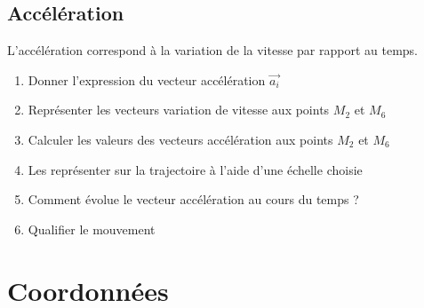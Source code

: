 \documentclass[a4paper,11pt,fleqn]{article}%
\begin{document}
	\subsection*{Accélération}
	L'accélération correspond à la variation de la vitesse par rapport au temps.
	\begin{enumerate}[resume]
	\item Donner l'expression du vecteur accélération $\vec{a_i}$
	\item Représenter les vecteurs variation de vitesse aux points $M_2$ et $M_6$
	\item Calculer les valeurs des vecteurs accélération aux points $M_2$ et $M_6$
	\item Les représenter sur la trajectoire à l'aide d'une échelle choisie
	\item Comment évolue le vecteur accélération au cours du temps ?
	\item Qualifier le mouvement
	\end{enumerate}
\section{Coordonnées}
\end{document}
